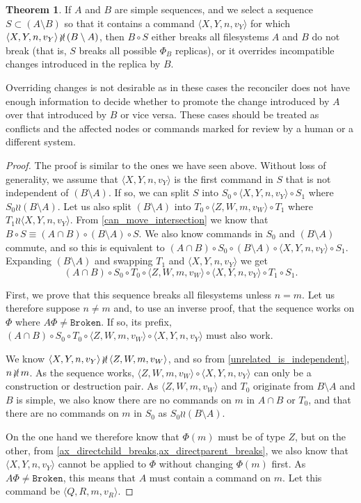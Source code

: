 \documentclass[12pt]{article}
\newcommand{\fsbroken}{\mathtt{Broken}} %
\newcommand{\FS}{\Phi} %
\newcommand{\valvy}{v_Y} %
\newcommand{\valvw}{v_W}
\newcommand{\valvr}{v_R}
\newcommand{\caaaa}[4]{\langle{#1,#2,#3,#4}\rangle}
\newcommand{\cxynv}{\caaaa{X}{Y}{n}{\valvy}}
\newcommand{\czwmv}{\caaaa{Z}{W}{m}{\valvw}}
\newcommand{\cqrmv}{\caaaa{Q}{R}{m}{\valvr}}
\newcommand{\cc}{\circ} %
\newcommand{\indep}{\mathrel{\wr\wr}} %
\newcommand{\unrel}{\indep} %
\newcommand{\nindep}{\,{\centernot{\wr\wr}}\,} %
\newcommand{\nunrel}{\nindep} %
\newcommand{\acb}{(A\cap B)}
\newcommand{\amb}{(A\setminus B)}
\newcommand{\bma}{(B\setminus A)}
\theoremstyle{definition}
\newtheorem{myth}{Theorem}
\begin{document}
\begin{myth}\label{rec_is_complete}
If $A$ and $B$ are simple sequences,
and we select a sequence $S\subset \amb$ so that
it contains a command $\cxynv$ for which $\cxynv\nindep\bma$,
then $B\cc S$ either breaks all filesystems $A$ and $B$ do not break
(that is, $S$ breaks all possible $\FS_B$ replicas),
or it overrides incompatible changes introduced in the replica by $B$.
\end{myth}
Overriding changes is not desirable as in these cases the reconciler
does not have enough information to decide whether to promote
the change introduced by $A$ over that introduced by $B$ or vice versa.
These cases should be treated as conflicts and
the affected nodes or commands marked for review
by a human or a different system.
\begin{proof}
The proof is similar to the ones we have seen above.
Without loss of generality, we assume that $\cxynv$ is the first command in $S$
that is not independent of $\bma$.
If so, we can split $S$ into $S_0\cc\cxynv\cc S_1$ where $S_0\indep\bma$.
Let us also split $\bma$ into $T_0\cc\czwmv\cc T_1$ where $T_1\indep\cxynv$.
From \cref{can_move_intersection} we know that
$B\cc S \equiv \acb\cc\bma\cc S$.
We also know commands in $S_0$ and $\bma$ commute, and so this is equivalent to
$\acb\cc S_0\cc\bma\cc\cxynv\cc S_1$.
Expanding $\bma$ and swapping $T_1$ and $\cxynv$ we get
\[ \acb\cc S_0\cc T_0 \cc \czwmv \cc \cxynv\cc T_1\cc S_1. \]

First, we prove that this sequence breaks all filesystems
unless $n=m$.
Let us therefore suppose $n\neq m$ and, to use an inverse proof,
that the sequence works on $\FS$ where $A\FS\neq\fsbroken$.
If so, its prefix, $\acb\cc S_0\cc T_0 \cc \czwmv \cc \cxynv$ must also work.

We know $\cxynv\nindep\czwmv$, and so from \cref{unrelated_is_independent}, $n\nunrel m$.
As the sequence works, $\czwmv\cc\cxynv$ can only be a construction or destruction pair.
As $\czwmv$ and $T_0$ originate from $B\setminus A$ and $B$ is simple, we also know there are
no commands on $m$ in $A\cap B$ or $T_0$,
and that there are no commands on $m$ in $S_0$ as $S_0\indep\bma$.

On the one hand we therefore know that $\FS(m)$ must be of type $Z$,
but on the other, from \cref{ax_directchild_breaks,ax_directparent_breaks},
we also know that $\cxynv$ cannot be applied to $\FS$ without
changing $\FS(m)$ first.
As $A\FS\neq\fsbroken$, this means that $A$ must contain a command on $m$.
Let this command be $\cqrmv$.


\end{proof}
\end{document}
